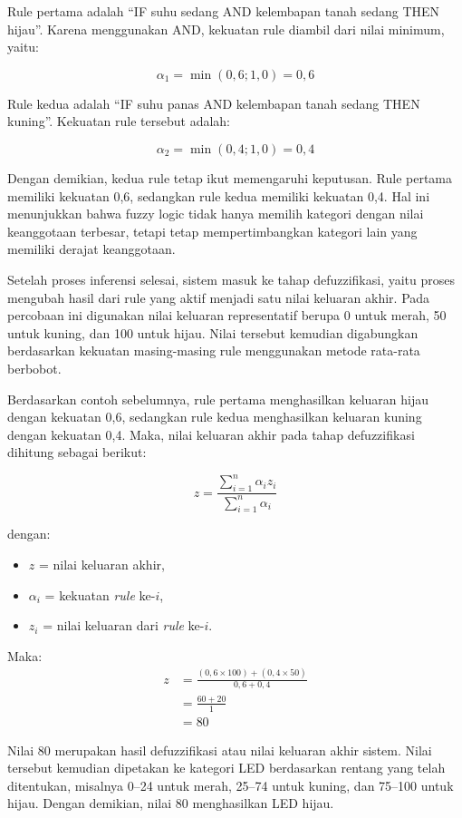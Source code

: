 \documentclass[12pt,a4paper]{article}
\begin{document}
Rule pertama adalah “IF suhu sedang AND kelembapan tanah sedang THEN hijau”. Karena menggunakan AND, kekuatan rule diambil dari nilai minimum, yaitu:

\[
\alpha_1 = \min(0{,}6;1{,}0)=0{,}6
\]

Rule kedua adalah “IF suhu panas AND kelembapan tanah sedang THEN kuning”. Kekuatan rule tersebut adalah:

\[
\alpha_2 = \min(0{,}4;1{,}0)=0{,}4
\]

Dengan demikian, kedua rule tetap ikut memengaruhi keputusan. Rule pertama memiliki kekuatan 0,6, sedangkan rule kedua memiliki kekuatan 0,4. Hal ini menunjukkan bahwa fuzzy logic tidak hanya memilih kategori dengan nilai keanggotaan terbesar, tetapi tetap mempertimbangkan kategori lain yang memiliki derajat keanggotaan.

Setelah proses inferensi selesai, sistem masuk ke tahap defuzzifikasi, yaitu proses mengubah hasil dari rule yang aktif menjadi satu nilai keluaran akhir. Pada percobaan ini digunakan nilai keluaran representatif berupa 0 untuk merah, 50 untuk kuning, dan 100 untuk hijau. Nilai tersebut kemudian digabungkan berdasarkan kekuatan masing-masing rule menggunakan metode rata-rata berbobot.

Berdasarkan contoh sebelumnya, rule pertama menghasilkan keluaran hijau dengan kekuatan 0,6, sedangkan rule kedua menghasilkan keluaran kuning dengan kekuatan 0,4. Maka, nilai keluaran akhir pada tahap defuzzifikasi dihitung sebagai berikut:

\[
z = \frac{\sum_{i=1}^{n} \alpha_i z_i}{\sum_{i=1}^{n} \alpha_i}
\]

dengan:
\begin{itemize}
    \item $z$ = nilai keluaran akhir,
    \item $\alpha_i$ = kekuatan \textit{rule} ke-$i$,
    \item $z_i$ = nilai keluaran dari \textit{rule} ke-$i$.
\end{itemize}

Maka:
\begin{align}
z &= \frac{(0,6 \times 100) + (0,4 \times 50)}
         {0,6 + 0,4} \\
  &= \frac{60 + 20}{1} \\
  &= 80
\end{align}

Nilai 80 merupakan hasil defuzzifikasi atau nilai keluaran akhir sistem. Nilai tersebut kemudian dipetakan ke kategori LED berdasarkan rentang yang telah ditentukan, misalnya 0–24 untuk merah, 25–74 untuk kuning, dan 75–100 untuk hijau. Dengan demikian, nilai 80 menghasilkan LED hijau.
\end{document}
